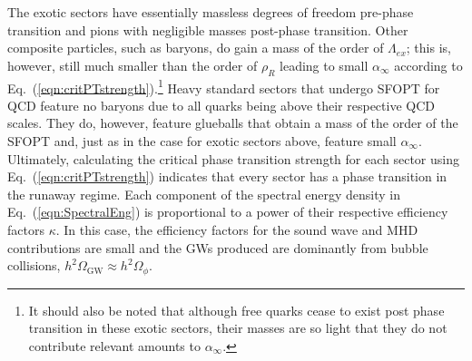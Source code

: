 \documentclass[nofootinbib,twocolumn,preprintnumbers]{revtex4-1}
\begin{document}
The exotic sectors have essentially massless degrees of freedom pre-phase transition and pions with negligible masses post-phase transition. Other composite particles, such as baryons, do gain a mass of the order of $\Lambda_{ex}$; this is, however, still much smaller than the order of $\rho_R$ leading to small $\alpha_{\infty}$ according to Eq.~(\ref{eqn:critPTstrength}).\footnote {It should also be noted that although free quarks cease to exist post phase transition in these exotic sectors, their masses are so light that they do not contribute relevant amounts to $\alpha_{\infty}$.} Heavy standard sectors that undergo SFOPT for QCD feature no baryons due to all quarks being above their respective QCD scales. They do, however, feature glueballs that obtain a mass of the order of the SFOPT and, just as in the case for exotic sectors above, feature small $\alpha_{\infty}$. Ultimately, calculating the critical phase transition strength for each sector using Eq.~(\ref{eqn:critPTstrength}) indicates that every sector has a phase transition in the runaway regime. 
Each component of the spectral energy density in Eq.~(\ref{eqn:SpectralEng}) is proportional to a power of their respective efficiency factors $\kappa$. In this case, the efficiency factors for the sound wave and MHD contributions are small and the GWs produced are dominantly from bubble collisions, $h^2\Omega_{\textrm{GW}} \approx h^2\Omega_{\phi}$. 
\end{document}
